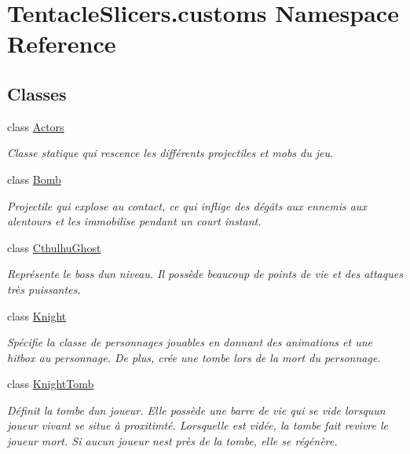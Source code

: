 \hypertarget{namespace_tentacle_slicers_1_1customs}{}\section{Tentacle\+Slicers.\+customs Namespace Reference}
\label{namespace_tentacle_slicers_1_1customs}
\subsection*{Classes}
\begin{DoxyCompactItemize}
\item 
class \hyperlink{class_tentacle_slicers_1_1customs_1_1_actors}{Actors}
\begin{DoxyCompactList}\small\item\em Classe statique qui rescence les différents projectiles et mobs du jeu. \end{DoxyCompactList}\item 
class \hyperlink{class_tentacle_slicers_1_1customs_1_1_bomb}{Bomb}
\begin{DoxyCompactList}\small\item\em Projectile qui explose au contact, ce qui inflige des dégâts aux ennemis aux alentours et les immobilise pendant un court instant. \end{DoxyCompactList}\item 
class \hyperlink{class_tentacle_slicers_1_1customs_1_1_cthulhu_ghost}{Cthulhu\+Ghost}
\begin{DoxyCompactList}\small\item\em Représente le boss d\textquotesingle{}un niveau. Il possède beaucoup de points de vie et des attaques très puissantes. \end{DoxyCompactList}\item 
class \hyperlink{class_tentacle_slicers_1_1customs_1_1_knight}{Knight}
\begin{DoxyCompactList}\small\item\em Spécifie la classe de personnages jouables en donnant des animations et une hitbox au personnage. De plus, crée une tombe lors de la mort du personnage. \end{DoxyCompactList}\item 
class \hyperlink{class_tentacle_slicers_1_1customs_1_1_knight_tomb}{Knight\+Tomb}
\begin{DoxyCompactList}\small\item\em Définit la tombe d\textquotesingle{}un joueur. Elle possède une barre de vie qui se vide lorsqu\textquotesingle{}un joueur vivant se situe à proxitimté. Lorsqu\textquotesingle{}elle est vidée, la tombe fait revivre le joueur mort. Si aucun joueur n\textquotesingle{}est près de la tombe, elle se régénère. \end{DoxyCompactList}\item 

\end{DoxyCompactItemize}
